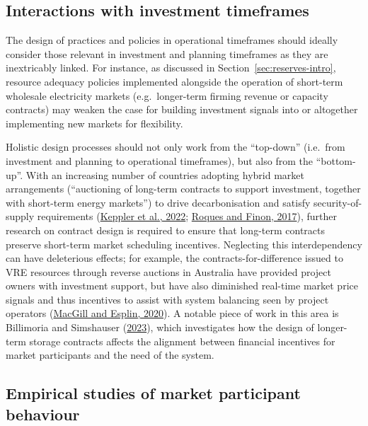 \documentclass[12pt,a4paper,]{report}
\begin{document}
\hypertarget{interactions-with-investment-timeframes}{%
\subsection{Interactions with investment
timeframes}\label{interactions-with-investment-timeframes}}

The design of practices and policies in operational timeframes should
ideally consider those relevant in investment and planning timeframes as
they are inextricably linked. For instance, as discussed in
Section~\ref{sec:reserves-intro}, resource adequacy policies implemented
alongside the operation of short-term wholesale electricity markets
(e.g.~longer-term firming revenue or capacity contracts) may weaken the
case for building investment signals into or altogether implementing new
markets for flexibility.

Holistic design processes should not only work from the ``top-down''
(i.e.~from investment and planning to operational timeframes), but also
from the ``bottom-up''. With an increasing number of countries adopting
hybrid market arrangements (``auctioning of long-term contracts to
support investment, together with short-term energy markets'') to drive
decarbonisation and satisfy security-of-supply requirements
(\protect\hyperlink{ref-kepplerWhySustainableProvision2022}{Keppler et
al., 2022};
\protect\hyperlink{ref-roquesAdaptingElectricityMarkets2017}{Roques and
Finon, 2017}), further research on contract design is required to ensure
that long-term contracts preserve short-term market scheduling
incentives. Neglecting this interdependency can have deleterious
effects; for example, the contracts-for-difference issued to VRE
resources through reverse auctions in Australia have provided project
owners with investment support, but have also diminished real-time
market price signals and thus incentives to assist with system balancing
seen by project operators
(\protect\hyperlink{ref-macgillEndtoendElectricityMarket2020}{MacGill
and Esplin, 2020}). A notable piece of work in this area is Billimoria
and Simshauser
(\protect\hyperlink{ref-billimoriaContractDesignStorage2023a}{2023}),
which investigates how the design of longer-term storage contracts
affects the alignment between financial incentives for market
participants and the need of the system.

\hypertarget{empirical-studies-of-market-participant-behaviour}{%
\subsection{Empirical studies of market participant
behaviour}\label{empirical-studies-of-market-participant-behaviour}}
\end{document}
